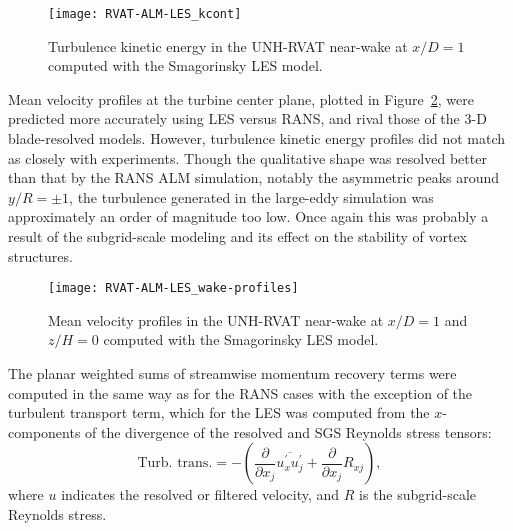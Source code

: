 \begin{figure}
    \centering
    
    \texttt{[image: RVAT-ALM-LES\_kcont]}
    
    \caption{Turbulence kinetic energy in the UNH-RVAT near-wake at $x/D=1$
        computed with the Smagorinsky LES model.}
    
    \label{fig:RVAT-ALM-LES-kcont}
\end{figure}

Mean velocity profiles at the turbine center plane, plotted in
Figure~\ref{fig:RVAT-ALM-LES-profiles}, were predicted more accurately using LES
versus RANS, and rival those of the 3-D blade-resolved models. However,
turbulence kinetic energy profiles did not match as closely with experiments.
Though the qualitative shape was resolved better than that by the RANS ALM
simulation, notably the asymmetric peaks around $y/R = \pm 1$, the turbulence
generated in the large-eddy simulation was approximately an order of magnitude
too low. Once again this was probably a result of the subgrid-scale modeling and
its effect on the stability of vortex structures.

\begin{figure}
    \centering
    
    \texttt{[image: RVAT-ALM-LES\_wake-profiles]}
    
    \caption{Mean velocity profiles in the UNH-RVAT near-wake at $x/D=1$ and
        $z/H=0$ computed with the Smagorinsky LES model.}
    
    \label{fig:RVAT-ALM-LES-profiles}
\end{figure}

The planar weighted sums of streamwise momentum recovery terms were computed in
the same way as for the RANS cases with the exception of the turbulent transport
term, which for the LES was computed from the $x$-components of the divergence
of the resolved and SGS Reynolds stress tensors:
\begin{equation}
    \text{Turb. trans.} = - \left( \frac{\partial}{\partial x_j}
    \overline{u^\prime_x u^\prime_j} 
    + \frac{\partial}{\partial x_j} R_{xj}
    \right),
\end{equation}
where $u$ indicates the resolved or filtered velocity, and $R$ is the
subgrid-scale Reynolds stress.

